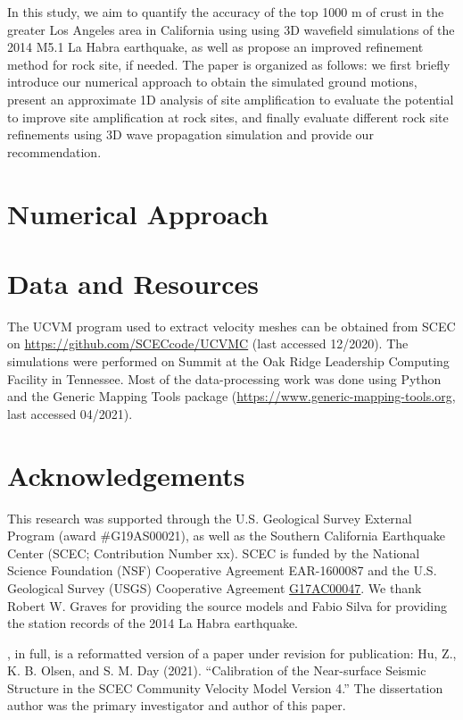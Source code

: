 In this study, we aim to quantify the accuracy of the top 1000 m of crust in the greater Los Angeles area in California using using 3D wavefield simulations of the 2014 M5.1 La Habra earthquake, as well as propose an improved refinement method for rock site, if needed. The paper is organized as follows: we first briefly introduce our numerical approach to obtain the simulated ground motions, present an approximate 1D analysis of site amplification to evaluate the potential to improve site amplification at rock sites, and finally evaluate different rock site refinements using 3D wave propagation simulation and provide our recommendation.



\section{Numerical Approach}\label{vs30:approach}




\section*{Data and Resources}
The UCVM program used to extract velocity meshes can be obtained from SCEC on \url{https://github.com/SCECcode/UCVMC} (last accessed 12/2020). The simulations were performed on Summit at the Oak Ridge Leadership Computing Facility in Tennessee. Most of the data-processing work was done using Python and the Generic Mapping Tools package (\url{https://www.generic-mapping-tools.org}, last accessed 04/2021).


\section*{Acknowledgements}

This research was supported through the U.S. Geological Survey External Program (award \#G19AS00021), as well as the Southern California Earthquake Center (SCEC; Contribution Number xx). SCEC is funded by the National Science Foundation (NSF) Cooperative Agreement EAR-1600087 and the U.S. Geological Survey (USGS) Cooperative Agreement \url{G17AC00047}. We thank Robert W. Graves for providing the source models and Fabio Silva for providing the station records of the 2014 La Habra earthquake.

, in full, is a reformatted version of a paper under revision for publication: Hu, Z., K. B. Olsen, and S. M. Day (2021). ``Calibration of the Near-surface Seismic Structure in the SCEC Community Velocity Model Version 4.''
The dissertation author was the primary investigator and author of this paper.

